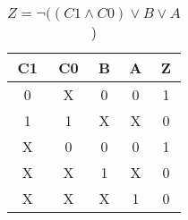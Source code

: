 
\begin{center}
    \begin{table}[h] \caption{\(Z = \lnot ((C1 \land C0) \lor B \lor A \))}
        \begin{center}
            \begin{tabular}{|c|c|c|c||c|} \hline
            C1 & C0 & B & A & Z \\ \hline\hline
            0  & X  & 0 & 0 & 1 \\ \hline
            1  & 1  & X & X & 0 \\ \hline
            X  & 0  & 0 & 0 & 1 \\ \hline
            X  & X  & 1 & X & 0 \\ \hline
            X  & X  & X & 1 & 0 \\ \hline
            \end{tabular}
        \end{center}
    \end{table}
\end{center}
